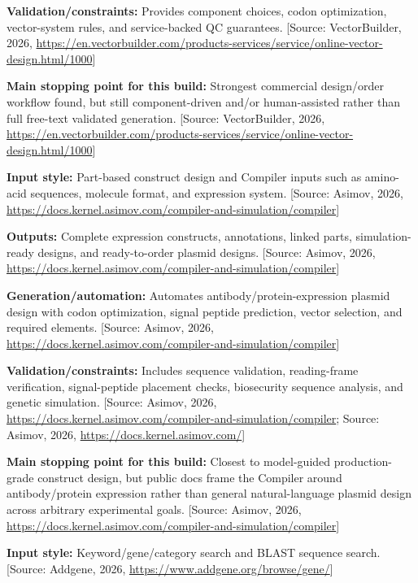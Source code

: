 \documentclass[11pt]{report}
\begin{document}
\begin{description}
\textbf{Validation/constraints:} Provides component choices, codon optimization, vector-system rules, and service-backed QC guarantees. [Source: VectorBuilder, 2026, \url{https://en.vectorbuilder.com/products-services/service/online-vector-design.html/1000}]\par
\textbf{Main stopping point for this build:} Strongest commercial design/order workflow found, but still component-driven and/or human-assisted rather than full free-text validated generation. [Source: VectorBuilder, 2026, \url{https://en.vectorbuilder.com/products-services/service/online-vector-design.html/1000}]\par
\item[Asimov Kernel]
\textbf{Input style:} Part-based construct design and Compiler inputs such as amino-acid sequences, molecule format, and expression system. [Source: Asimov, 2026, \url{https://docs.kernel.asimov.com/compiler-and-simulation/compiler}]\par
\textbf{Outputs:} Complete expression constructs, annotations, linked parts, simulation-ready designs, and ready-to-order plasmid designs. [Source: Asimov, 2026, \url{https://docs.kernel.asimov.com/compiler-and-simulation/compiler}]\par
\textbf{Generation/automation:} Automates antibody/protein-expression plasmid design with codon optimization, signal peptide prediction, vector selection, and required elements. [Source: Asimov, 2026, \url{https://docs.kernel.asimov.com/compiler-and-simulation/compiler}]\par
\textbf{Validation/constraints:} Includes sequence validation, reading-frame verification, signal-peptide placement checks, biosecurity sequence analysis, and genetic simulation. [Source: Asimov, 2026, \url{https://docs.kernel.asimov.com/compiler-and-simulation/compiler}; Source: Asimov, 2026, \url{https://docs.kernel.asimov.com/}]\par
\textbf{Main stopping point for this build:} Closest to model-guided production-grade construct design, but public docs frame the Compiler around antibody/protein expression rather than general natural-language plasmid design across arbitrary experimental goals. [Source: Asimov, 2026, \url{https://docs.kernel.asimov.com/compiler-and-simulation/compiler}]\par
\item[Addgene search]
\textbf{Input style:} Keyword/gene/category search and BLAST sequence search. [Source: Addgene, 2026, \url{https://www.addgene.org/browse/gene/}]\par

\end{description}
\end{document}
